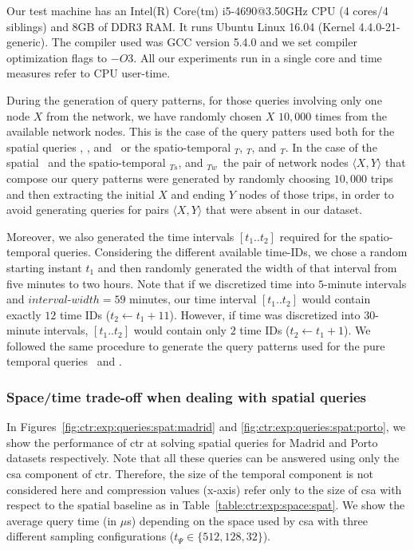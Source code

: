 	Our test machine has an Intel(R) Core(tm) i5-4690@3.50GHz CPU (4 cores/4 siblings) and 8GB of DDR3 RAM. 
	It runs Ubuntu Linux 16.04 (Kernel 4.4.0-21-generic). The compiler used was GCC version 5.4.0 and we set compiler optimization flags to $-O3$. All our experiments run in a single core and time measures refer to CPU user-time.

	During the generation of query patterns, for those queries involving only one node $X$ from the network, 
	we have randomly chosen $X$ $10,\!000$ times from the available network nodes. 
	This is the case of the query patters used both for
	the spatial queries \startX, \endX, and \loadX\ or the spatio-temporal \startX$_T$, \endX$_T$, and \loadX$_T$.
	In the case of the spatial \XtoY\ and the spatio-temporal \XtoY$_{Ts}$, and \XtoY$_{Tw}$\ the pair of
	network nodes $\langle X,Y \rangle$ that compose our
	query patterns were generated by randomly choosing
	$10,\!000$ trips and then extracting the initial $X$ and ending $Y$ nodes of those trips, in order to avoid generating queries for pairs $\langle X,Y \rangle$ that were absent in our dataset.

	Moreover, we also generated the time intervals $[t_1..t_2]$ required for 
	the spatio-temporal queries. Considering the different available time-IDs, we chose a random starting
	instant $t_1$ and then randomly generated the width of that interval from five minutes to two hours.
	Note that if we discretized time into $5$-minute intervals and $interval$-$width=59$ minutes, our time
	interval $[t_1..t_2]$ would contain exactly $12$ time IDs ($t_2\leftarrow t_1+11$). However, if time was
	discretized into $30$-minute intervals, $[t_1..t_2]$ would contain only $2$ time IDs ($t_2\leftarrow t_1+1$).
	We followed the same procedure to generate the query patterns used for the pure temporal queries \loadT\ and \startT.

	\subsubsection{Space/time trade-off when dealing with spatial queries} \label{sec:ctr:exp:queries:spat}

	In Figures~\ref{fig:ctr:exp:queries:spat:madrid} and \ref{fig:ctr:exp:queries:spat:porto}, we show the performance of \gls{ctr} at
	solving spatial queries for Madrid and Porto datasets respectively. 
	Note that all these queries can be answered using only the \gls{csa} component
	of \gls{ctr}. Therefore, the size of the temporal component 
	is not considered here and compression values (x-axis) refer only to the size of \gls{csa} with
	respect to the spatial baseline as in Table~\ref{table:ctr:exp:space:spat}. 
	We show the average query time (in $\mu$s) depending on the
	space used by \gls{csa} with three different 
	sampling configurations ($t_{\Psi} \in \{512, 128, 32\}$).

